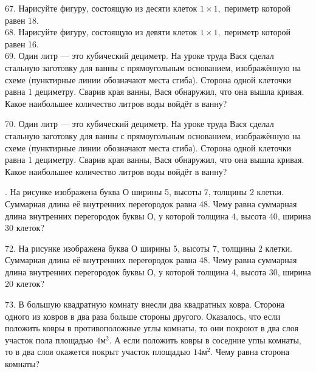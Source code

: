 67. Нарисуйте фигуру, состоящую из десяти клеток $1\times1,$ периметр которой равен 18.\\
68. Нарисуйте фигуру, состоящую из девяти клеток $1\times1,$ периметр которой равен 16.\\
69. Один литр --- это кубический дециметр. На уроке труда Вася сделал стальную заготовку для ванны с прямоугольным основанием, изображённую на схеме (пунктирные линии обозначают места сгиба). Сторона одной клеточки равна 1 дециметру. Сварив края ванны, Вася обнаружил, что она вышла кривая. Какое наибольшее количество литров воды войдёт в ванну?
\begin{center}
\begin{figure}[ht!]
\end{figure}
\end{center}
70. Один литр --- это кубический дециметр. На уроке труда Вася сделал стальную заготовку для ванны с прямоугольным основанием, изображённую на схеме (пунктирные линии обозначают места сгиба). Сторона одной клеточки равна 1 дециметру. Сварив края ванны, Вася обнаружил, что она вышла кривая. Какое наибольшее количество литров воды войдёт в ванну?
\begin{center}
\begin{figure}[ht!]
\end{figure}
\end{center}
\newpage
{}. На рисунке изображена буква О ширины 5, высоты 7, толщины 2 клетки. Суммарная длина её внутренних перегородок равна 48. Чему равна суммарная длина внутренних перегородок буквы О, у которой толщина 4, высота 40, ширина 30 клеток?
\begin{center}
\begin{figure}[ht!]
\end{figure}
\end{center}
72. На рисунке изображена буква О ширины 5, высоты 7, толщины 2 клетки. Суммарная длина её внутренних перегородок равна 48. Чему равна суммарная длина внутренних перегородок буквы О, у которой толщина 4, высота 30, ширина 20 клеток?
\begin{center}
\begin{figure}[ht!]
\end{figure}
\end{center}
73. В большую квадратную комнату внесли два квадратных ковра. Сторона одного из ковров в два раза больше стороны другого. Оказалось, что если положить ковры в противоположные углы комнаты, то они покроют в два слоя участок пола площадью $4\text{м}^2.$ А если положить ковры в соседние углы комнаты, то в два слоя окажется покрыт участок площадью $14\text{м}^2.$ Чему равна сторона комнаты?\\
